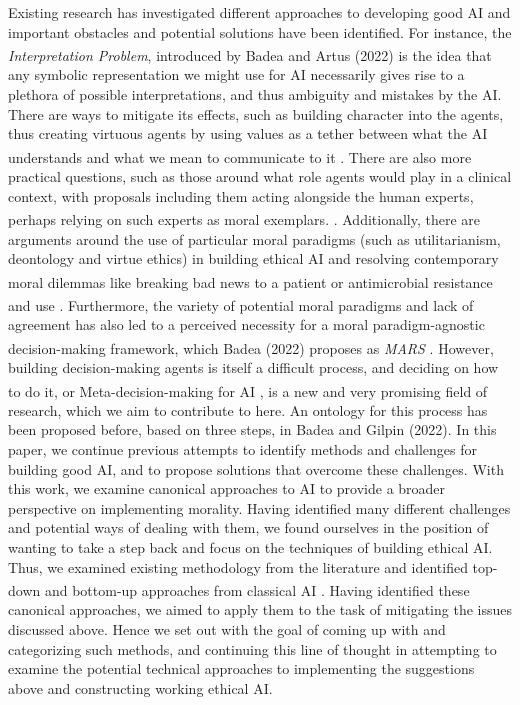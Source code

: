 \documentclass[10pt]{article}
\begin{document}
Existing research has investigated different approaches to developing good AI and important obstacles and potential solutions have been identified. For instance, the \textit{Interpretation Problem}, introduced by Badea and Artus (2022)\textsuperscript{\cite{badea_morality_2022}} is the idea that any symbolic representation we might use for AI necessarily gives rise to a plethora of possible interpretations, and thus ambiguity and mistakes by the AI. There are ways to mitigate its effects, such as building character into the agents, thus creating virtuous agents by using values as a tether between what the AI understands and what we mean to communicate to it \textsuperscript{\cite{badea_morality_2022}}. There are also more practical questions, such as those around what role agents would play in a clinical context, with proposals including them acting alongside the human experts, perhaps relying on such experts as moral exemplars. \textsuperscript{\cite{hindocha_moral_2022}}. Additionally, there are arguments around the use of particular moral paradigms (such as utilitarianism, deontology and virtue ethics) in building ethical AI and resolving contemporary moral dilemmas like breaking bad news to a patient \textsuperscript{\cite{post_breaking_2022}} or antimicrobial resistance and use  \textsuperscript{\cite{bolton_developing_2022}}. Furthermore, the variety of potential moral paradigms and lack of agreement has also led to a perceived necessity for a moral paradigm-agnostic decision-making framework, which Badea (2022) proposes as \textit{MARS} \textsuperscript{\cite{badea_have_2022}}. However, building decision-making agents is itself a difficult process, and deciding on how to do it, or Meta-decision-making for AI \textsuperscript{\cite{badea_establishing_2022}}, is a new and very promising field of research, which we aim to contribute to here. An ontology for this process has been proposed before, based on three steps, in Badea and Gilpin (2022).
In this paper, we continue previous attempts to identify methods and challenges for building good AI, and to propose solutions that overcome these challenges. With this work, we examine canonical approaches to AI to provide a broader perspective on implementing morality. Having identified many different challenges and potential ways of dealing with them, we found ourselves in the position of wanting to take a step back and focus on the techniques of building ethical AI. Thus, we examined existing methodology from the literature and identified top-down and bottom-up approaches from classical AI \textsuperscript{\cite{abel_reinforcement_2016}}. Having identified these canonical approaches, we aimed to apply them to the task of mitigating the issues discussed above. Hence we set out with the goal of coming up with and categorizing such methods, and continuing this line of thought in attempting to examine the potential technical approaches to implementing the suggestions above and constructing working ethical AI. 
\end{document}
